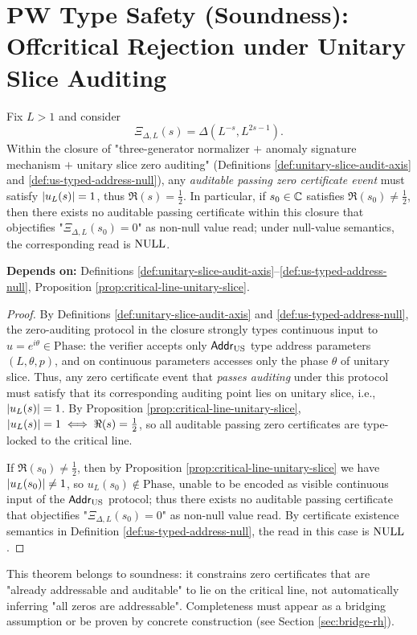 \section{PW Type Safety (Soundness): Offcritical Rejection under Unitary Slice Auditing}

\begin{theorem}\label{thm:type-safety-offcritical}
Fix $L>1$ and consider
$$
\Xi_{\Delta,L}(s)=\Delta(L^{-s},L^{2s-1}).
$$
Within the closure of "three-generator normalizer $+$ anomaly signature mechanism $+$ unitary slice zero auditing" (Definitions \ref{def:unitary-slice-audit-axis} and \ref{def:us-typed-address-null}), any \emph{auditable passing zero certificate event} must satisfy $\left\lvert u_L(s)\right\rvert=1$, thus $\Re(s)=\tfrac12$. In particular, if $s_0\in\mathbb{C}$ satisfies $\Re(s_0)\neq \tfrac12$, then there exists no auditable passing certificate within this closure that objectifies "$\Xi_{\Delta,L}(s_0)=0$" as non-null value read; under null-value semantics, the corresponding read is $\mathrm{NULL}$.\par
\noindent\textnormal{\textbf{Depends on:} Definitions \ref{def:unitary-slice-audit-axis}--\ref{def:us-typed-address-null}, Proposition \ref{prop:critical-line-unitary-slice}.}\par
\end{theorem}

\begin{proof}
By Definitions \ref{def:unitary-slice-audit-axis} and \ref{def:us-typed-address-null}, the zero-auditing protocol in the closure strongly types continuous input to $u=e^{i\theta}\in\mathrm{Phase}$: the verifier accepts only $\mathsf{Addr}_{\mathrm{US}}$ type address parameters $(L,\theta,p)$, and on continuous parameters accesses only the phase $\theta$ of unitary slice. Thus, any zero certificate event that \emph{passes auditing} under this protocol must satisfy that its corresponding auditing point lies on unitary slice, i.e., $\left\lvert u_L(s)\right\rvert=1$. By Proposition \ref{prop:critical-line-unitary-slice}, $\left\lvert u_L(s)\right\rvert=1\iff \Re(s)=\tfrac12$, so all auditable passing zero certificates are type-locked to the critical line.\par
If $\Re(s_0)\neq\tfrac12$, then by Proposition \ref{prop:critical-line-unitary-slice} we have $\left\lvert u_L(s_0)\right\rvert\neq 1$, so $u_L(s_0)\notin\mathrm{Phase}$, unable to be encoded as visible continuous input of the $\mathsf{Addr}_{\mathrm{US}}$ protocol; thus there exists no auditable passing certificate that objectifies "$\Xi_{\Delta,L}(s_0)=0$" as non-null value read. By certificate existence semantics in Definition \ref{def:us-typed-address-null}, the read in this case is $\mathrm{NULL}$.\par
\end{proof}

This theorem belongs to soundness: it constrains zero certificates that are "already addressable and auditable" to lie on the critical line, not automatically inferring "all zeros are addressable". Completeness must appear as a bridging assumption or be proven by concrete construction (see Section \ref{sec:bridge-rh}).\par
